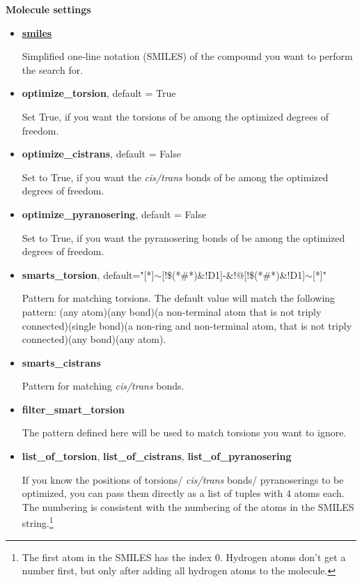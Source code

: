 \documentclass[a4paper]{article}
\begin{document}
\noindent
\textbf{\large{Molecule settings}}

\begin{itemize}

	
    \item{\underline{\textbf{\large{smiles}}}}
	
Simplified one-line notation (SMILES) of the compound you want to perform the search for.  
	\item{\textbf{optimize\_torsion}}, default = True 

Set True, if you want the torsions of be among the optimized degrees of freedom.

	\item{\textbf{optimize\_cistrans}}, default = False

Set to True, if you want the \textit{cis/trans} bonds of be among the optimized degrees of freedom.

	\item{\textbf{optimize\_pyranosering}}, default = False

Set to True, if you want the pyranosering bonds of be among the optimized degrees of freedom.

	\item{\textbf{smarts\_torsion}}, default="[*]$\sim$[!\$(*\#*)\&!D1]-\&!@[!\$(*\#*)\&!D1]$\sim$[*]"

Pattern for matching torsions. The default value will match the following pattern: (any atom)(any bond)(a non-terminal atom that is not triply connected)(single bond)(a non-ring and non-terminal atom, that is not triply connected)(any bond)(any atom). 

	\item{\textbf{smarts\_cistrans}}

Pattern for matching \textit{cis/trans} bonds. 

	\item{\textbf{filter\_smart\_torsion}}

The pattern defined here will be used to match torsions you want to ignore. 

	\item{\textbf{list\_of\_torsion}, \textbf{list\_of\_cistrans}, \textbf{list\_of\_pyranosering}}

If you know the positions of torsions/ \textit{cis/trans} bonds/ pyranoserings to be optimized, you can pass them directly as a list of tuples with 4 atoms each. The numbering is consistent with the numbering of the atoms in the SMILES string.\footnote{The first atom in the SMILES has the index 0. Hydrogen atoms don't get a number first, but only after adding all hydrogen atoms to the molecule.}


\end{itemize}
\end{document}
